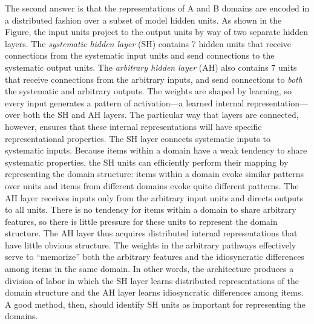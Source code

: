 The second answer is that the representations of A and B domains are encoded in a distributed fashion over a subset of model hidden units. As shown in the Figure, the input units project to the output units by way of two separate hidden layers. The {\em systematic hidden layer} (SH) contains 7 hidden units that receive connections from the systematic input units and send connections to the systematic output units. The {\em arbitrary hidden layer} (AH) also contains 7 units that receive connections from the arbitrary inputs, and send connections to {\em both} the systematic and arbitrary outputs.  The weights are shaped by learning, so every input generates a pattern of activation---a learned internal representation---over both the SH and AH layers. The particular way that layers are connected, however, ensures that these internal representations will have specific representational properties. The SH layer connects systematic inputs to systematic inputs. Because items within a domain have a weak tendency to share systematic properties, the SH units can efficiently perform their mapping by representing the domain structure: items within a domain evoke similar patterns over units and items from different domains evoke quite different patterns. The AH layer receives inputs only from the arbitrary input units and directs outputs to all units. There is no tendency for items within a domain to share arbitrary features, so there is little pressure for these units to represent the domain structure. The AH layer thus acquires distributed internal representations that have little obvious structure. The weights in the arbitrary pathways effectively serve to ``memorize'' both the arbitrary features and the idiosyncratic differences among items in the same domain. In other words, the architecture produces a division of labor in which the SH layer learns distributed representations of the domain structure and the AH layer learns idiosyncratic differences among items. A good method, then, should identify SH units as important for representing the domains.

